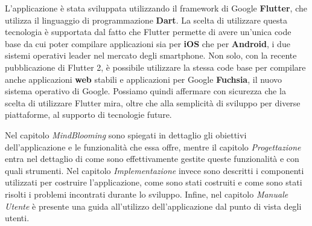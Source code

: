 L'applicazione è stata sviluppata utilizzando il framework di Google \textbf{Flutter}, che utilizza il linguaggio di programmazione \textbf{Dart}. La scelta di utilizzare questa tecnologia è supportata dal fatto che Flutter permette di avere un'unica code base da cui poter compilare applicazioni sia per \textbf{iOS} che per \textbf{Android}, i due sistemi operativi leader nel mercato degli smartphone.
Non solo, con la recente pubblicazione di Flutter 2, è possibile utilizzare la stessa code base per compilare anche applicazioni \textbf{web} stabili e applicazioni per Google \textbf{Fuchsia}, il nuovo sistema operativo di Google. Possiamo quindi affermare con sicurezza che la scelta di utilizzare Flutter mira, oltre che alla semplicità di sviluppo per diverse piattaforme, al supporto di tecnologie future.

Nel capitolo \textit{MindBlooming} sono spiegati in dettaglio gli obiettivi dell'applicazione e le funzionalità che essa offre, mentre il capitolo \textit{Progettazione} entra nel dettaglio di come sono effettivamente gestite queste funzionalità e con quali strumenti. Nel capitolo \textit{Implementazione} invece sono descritti i componenti utilizzati per costruire l'applicazione, come sono stati costruiti e come sono stati risolti i problemi incontrati durante lo sviluppo. Infine, nel capitolo \textit{Manuale Utente} è presente una guida all'utilizzo dell'applicazione dal punto di vista degli utenti.